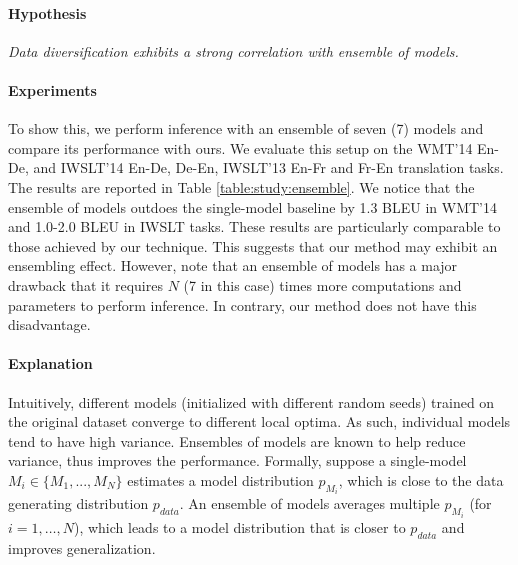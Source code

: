\documentclass{article}
\begin{document}
\paragraph{Hypothesis} \emph{Data diversification exhibits a strong correlation with ensemble of models.}

\vspace{-0.5em}
\paragraph{Experiments}



To show this, we perform inference with an ensemble of seven (7) models and compare its performance with ours. We evaluate this setup on the WMT'14 En-De, and IWSLT'14 En-De, De-En, IWSLT'13 En-Fr and Fr-En translation tasks. The results are reported in Table \ref{table:study:ensemble}. We notice that the ensemble of models outdoes the single-model baseline by 1.3 BLEU in WMT'14 and 1.0-2.0 BLEU in IWSLT tasks. These results are particularly comparable to those achieved by our technique. This suggests that our method may exhibit an ensembling effect. However, note that an ensemble of models has a major drawback that it requires $N$ (7 in this case) times more computations and parameters to perform inference. In contrary, our method does not have this disadvantage.


\vspace{-0.5em}
\paragraph{Explanation} 


{Intuitively, different models (initialized with different random seeds) trained on the original dataset converge to different local optima.} As such, individual models tend to have high variance. Ensembles of models are known to help reduce variance, thus improves the performance. {Formally, suppose a single-model $M_i \in \{M_1,...,M_N\}$ estimates a model distribution $p_{M_i}$, which is close to the data generating distribution $p_{data}$.} An ensemble of models averages multiple $p_{M_i}$ (for $i= 1, \ldots, N$), which leads to a model distribution that is closer to $p_{data}$ and improves generalization.
\end{document}
